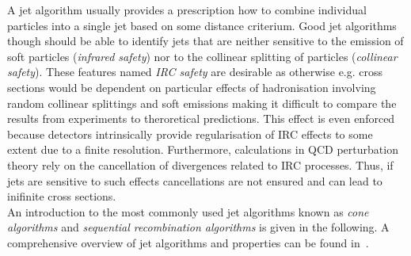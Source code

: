 A jet algorithm usually provides a prescription how to combine individual particles into a single jet based on some distance criterium. Good jet algorithms though should be able to identify jets that are neither sensitive to the emission of soft particles (\textit{infrared safety}) nor to the collinear splitting of particles (\textit{collinear safety}). These features named \textit{IRC safety} are desirable as otherwise e.g. cross sections would be dependent on particular effects of hadronisation involving random collinear splittings and soft emissions making it difficult to compare the results from experiments to theroretical predictions. This effect is even enforced because detectors intrinsically provide regularisation of IRC effects to some extent due to a finite resolution. Furthermore, calculations in QCD perturbation theory rely on the cancellation of divergences related to IRC processes. Thus, if jets are sensitive to such effects cancellations are not ensured and can lead to inifinite cross sections. \\
An introduction to the most commonly used jet algorithms known as \textit{cone algorithms} and \textit{sequential recombination algorithms} is given in the following. A comprehensive overview of jet algorithms and properties can be found in~\cite{Salam:2009jx}.
